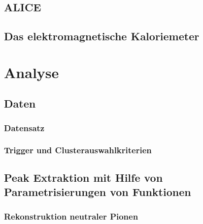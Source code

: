 \documentclass[11pt]{article}
\begin{document}
\subsection{ALICE}
\subsection{Das elektromagnetische Kaloriemeter}

\section{Analyse}
\subsection{Daten}
\subsubsection{Datensatz} \label{ssec:Datensatz}
\subsubsection{Trigger und Clusterauswahlkriterien}
\subsection{Peak Extraktion mit Hilfe von Parametrisierungen von Funktionen}
\subsubsection{Rekonstruktion neutraler Pionen}
\end{document}
